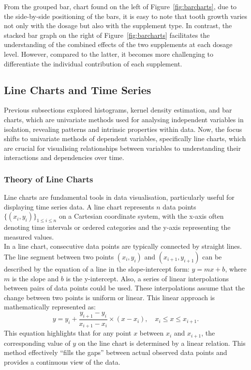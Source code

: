 \documentclass{article}\usepackage[]{graphicx}\usepackage[]{xcolor}
\numberwithin{equation}{section}
\begin{document}
\noindent From the grouped bar, chart found on the left of Figure~\ref{fig:barcharts}, due to the side-by-side positioning of the bars, it is easy to note that tooth growth varies not only with the dosage but also with the supplement type. In contrast, the stacked bar graph on the right of Figure~\ref{fig:barcharts} facilitates the understanding of the combined effects of the two supplements at each dosage level. However, compared to the latter, it becomes more challenging to differentiate the individual contribution of each supplement.

\subsection{Line Charts and Time Series}

\noindent
Previous subsections explored histograms, kernel density estimation, and bar charts, which are univariate methods used for analysing independent variables in isolation, revealing patterns and intrinsic properties within data. Now, the focus shifts to univariate methods of dependent variables, specifically line charts, which are crucial for visualising relationships between variables to understanding their interactions and dependencies over time.

\subsubsection{Theory of Line Charts}

Line charts are fundamental tools in data visualisation, particularly useful for displaying time series data. A line chart represents $n$ data points 
$\{(x_i,y_i)\}_{1 \leq i \leq n}$ on a Cartesian coordinate system, with the x-axis often denoting time intervals or ordered categories and the y-axis representing the measured values.\\ 

\noindent
In a line chart, consecutive data points are typically connected by straight lines. The line segment between two points \((x_i,y_i)\) and \((x_{i+1},y_{i+1})\) can be described by the equation of a line in the slope-intercept form: \(y=mx+b\), where \(m\) is the slope and \(b\) is the y-intercept. Also, a series of linear interpolations between pairs of data points could be used. These interpolations assume that the change between two points is uniform or linear. This linear approach is mathematically represented as:
\[
y = y_i + \frac{y_{i+1} - y_i}{x_{i+1} - x_i} \times (x - x_i), \quad  x_i \leq x \leq x_{i+1}.
\]
\noindent
This equation highlights that for any point \(x\) between \(x_i\) and \(x_{i+1}\), the corresponding value of \(y\) on the line chart is determined by a linear relation. This method effectively ``fills the gaps'' between actual observed data points and provides a continuous view of the data.
\end{document}
